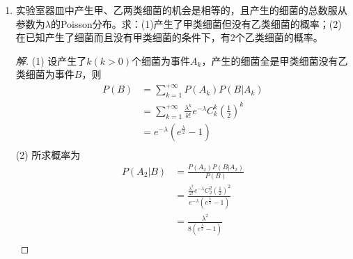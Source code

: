\documentclass[12pt]{article}
\newcommand{\hei}{\CJKfamily{hei}}                          %
\begin{document}
\begin{enumerate}
\item {\hei 实验室器皿中产生甲、乙两类细菌的机会是相等的，且产生的细菌的总数服从参数为$ \lambda $的Poisson分布。求：(1)产生了甲类细菌但没有乙类细菌的概率；(2)在已知产生了细菌而且没有甲类细菌的条件下，有2个乙类细菌的概率。}
\begin{proof}[解]
	(1) 设产生了$ k(k>0) $个细菌为事件$ A_k $，产生的细菌全是甲类细菌没有乙类细菌为事件$ B $，则
	\begin{equation}
		\begin{aligned}
		P\left( B \right)& =\sum\limits_{k=1}^{+\infty }{P\left( {{A}_{k}} \right)P\left( B\left| {{A}_{k}} \right. \right)} \\ 
		& =\sum\limits_{k=1}^{+\infty }{\frac{{{\lambda }^{k}}}{k!}{{e}^{-\lambda }}C_{k}^{k}{{\left( \frac{1}{2} \right)}^{k}}} \\ 
		& ={{e}^{-\lambda }}\left( {{e}^{\frac{\lambda }{2}}}-1 \right) \\ 
		\end{aligned}
	\end{equation}
	(2) 所求概率为
	\begin{equation}
		\begin{aligned}
			P\left( {{A}_{2}}\left| B \right. \right)& =\frac{P\left( {{A}_{2}} \right)P\left( B\left| {{A}_{2}} \right. \right)}{P\left( B \right)} \\ 
			& =\frac{\frac{{{\lambda }^{2}}}{2!}{{e}^{-\lambda }}C_{2}^{2}{{\left( \frac{1}{2} \right)}^{2}}}{{{e}^{-\lambda }}\left( {{e}^{\frac{\lambda }{2}}}-1 \right)} \\ 
			& =\frac{{{\lambda }^{2}}}{8\left( {{e}^{\frac{\lambda }{2}}}-1 \right)} \\ 
		\end{aligned}
	\end{equation}
\end{proof}



\end{enumerate}
\end{document}
